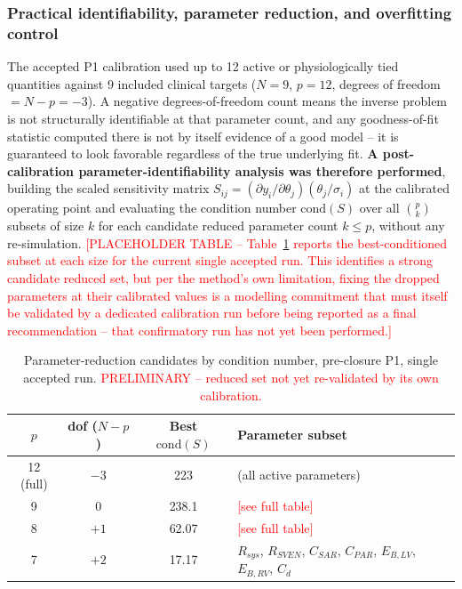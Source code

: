 \documentclass{article}
\begin{document}
\subsubsection{Practical identifiability, parameter reduction, and overfitting control}
\label{sec:identifiability}

The accepted P1 calibration used up to 12 active or physiologically tied quantities against 9 included clinical targets ($N=9$, $p{=}12$, degrees of freedom $= N-p = -3$). A negative degrees-of-freedom count means the inverse problem is not structurally identifiable at that parameter count, and any goodness-of-fit statistic computed there is not by itself evidence of a good model -- it is guaranteed to look favorable regardless of the true underlying fit. \textbf{A post-calibration parameter-identifiability analysis was therefore performed}, building the scaled sensitivity matrix $S_{ij} = (\partial y_i/\partial \theta_j)(\theta_j/\sigma_i)$ at the calibrated operating point and evaluating the condition number $\mathrm{cond}(S)$ over all $\binom{p}{k}$ subsets of size $k$ for each candidate reduced parameter count $k \le p$, without any re-simulation. \textcolor{red}{[PLACEHOLDER TABLE -- Table~\ref{tab:identifiability} reports the best-conditioned subset at each size for the current single accepted run. This identifies a strong candidate reduced set, but per the method's own limitation, fixing the dropped parameters at their calibrated values is a modelling commitment that must itself be validated by a dedicated calibration run before being reported as a final recommendation -- that confirmatory run has not yet been performed.]}

\begin{table}[ht]
\centering
\caption{Parameter-reduction candidates by condition number, pre-closure P1, single accepted run. \textcolor{red}{PRELIMINARY -- reduced set not yet re-validated by its own calibration.}}
\label{tab:identifiability}
\begin{tabular}{cccl}
\toprule
$p$ & dof ($N-p$) & Best $\mathrm{cond}(S)$ & Parameter subset \\
\midrule
12 (full) & $-3$ & 223 & (all active parameters) \\
9 & $0$ & 238.1 & \textcolor{red}{[see full table]} \\
8 & $+1$ & 62.07 & \textcolor{red}{[see full table]} \\
7 & $+2$ & 17.17 & $R_{sys}$, $R_{SVEN}$, $C_{SAR}$, $C_{PAR}$, $E_{B,LV}$, $E_{B,RV}$, $C_d$ \\
\bottomrule
\end{tabular}
\end{table}
\end{document}
